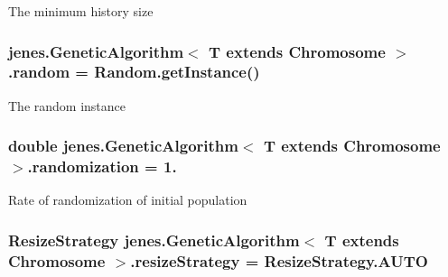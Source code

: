 The minimum history size \hypertarget{classjenes_1_1_genetic_algorithm_3_01_t_01extends_01_chromosome_01_4_a1579283e210144ba90b937be0911a028}{
\subsubsection[{random}]{ jenes.\-Genetic\-Algorithm$<$ T extends Chromosome $>$.random = {\bf Random.\-get\-Instance}()\hspace{0.3cm}{\ttfamily [protected]}}}\label{classjenes_1_1_genetic_algorithm_3_01_t_01extends_01_chromosome_01_4_a1579283e210144ba90b937be0911a028}
The random instance \hypertarget{classjenes_1_1_genetic_algorithm_3_01_t_01extends_01_chromosome_01_4_adcb3e16398451c2e318de21d77b51d35}{
\subsubsection[{randomization}]{\setlength{\rightskip}{0pt plus 5cm}double jenes.\-Genetic\-Algorithm$<$ T extends Chromosome $>$.randomization = 1.\hspace{0.3cm}{\ttfamily [protected]}}}\label{classjenes_1_1_genetic_algorithm_3_01_t_01extends_01_chromosome_01_4_adcb3e16398451c2e318de21d77b51d35}
Rate of randomization of initial population \hypertarget{classjenes_1_1_genetic_algorithm_3_01_t_01extends_01_chromosome_01_4_a56f08a1d1f3355921b83f08745dbb3b3}{
\subsubsection[{resize\-Strategy}]{\setlength{\rightskip}{0pt plus 5cm}Resize\-Strategy jenes.\-Genetic\-Algorithm$<$ T extends Chromosome $>$.resize\-Strategy = Resize\-Strategy.\-A\-U\-T\-O\hspace{0.3cm}{\ttfamily [protected]}}}\label{classjenes_1_1_genetic_algorithm_3_01_t_01extends_01_chromosome_01_4_a56f08a1d1f3355921b83f08745dbb3b3}
